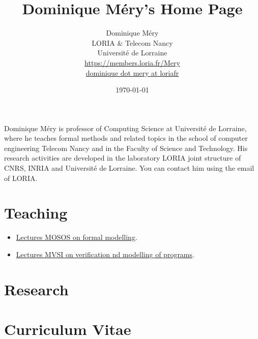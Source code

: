 \documentclass[ 12pt]{article}
\title{Dominique Méry's Home Page}
\author{Dominique M\'ery\\
LORIA \& Telecom Nancy\\ Universit\'e de Lorraine\\
\url{https://members.loria.fr/Mery}\\ \url{dominique dot mery at loriafr}}
\date{\today}
\begin{document}
  \setcounter{ex}{1}
\maketitle





Dominique Méry is  professor of Computing Science at Université  de
Lorraine, where he teaches     formal methods and related topics    in the school of computer engineering
Telecom Nancy and in the Faculty of Science and Technology.  His
research activities are developed in the laboratory  LORIA joint
structure  of CNRS, INRIA and  Université de Lorraine.  You can
contact him  using the email of LORIA.

\tableofcontents

\section{Teaching}





\begin{itemize}

\item[] \href{https://mery54.github.io/teaching/mosos/}{Lectures MOSOS 
    on formal modelling}.


  \item[] \href{https://mery54.github.io/teaching/mvsi/}{Lectures MVSI 
    on  verification  nd modelling of programs}.


  
\end{itemize}

\section{Research}



\section{Curriculum Vitae}
\newcommand{\nancyIesial}{\ca{Universit\'{e} de Nancy I~:~Ecole sup\'{e}rieure d'informatique appliqu\'{e}e de Lorraine}}
\newcommand{\inancyIesial}{Universit\'{e} Henri Poincar\'e -  Nancy I}
\newcommand{\nancyIesstin}{\ca{Universit\'{e} de Nancy I~(Ecole sup\'{e}rieure des sciences et technologies de l'ing\'{e}nieur de Nancy)}}
\newcommand{\inancyIesstin}{Universit\'{e} de Nancy I~(Ecole sup\'{e}rieure des sciences et technologies de l'ing\'{e}nieur de Nancy)}
\end{document}
